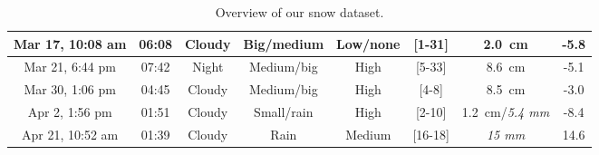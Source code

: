 \begin{table}[htbp]
\begin{tabular}{|c|c|c|c|c|c|c|c|}
        Mar 17, 10:08 am   &  06:08            & Cloudy        & Big/medium          & Low/none         & [1-31]                         & \SI{2.0}{\cm}                 & -5.8  \\\hline
        Mar 21, 6:44 pm    &  07:42            & Night         & Medium/big          & High             & [5-33]                         & \SI{8.6}{\cm}                 & -5.1  \\\hline
        Mar 30, 1:06 pm    &  04:45            & Cloudy        & Medium/big          & High             & [4-8]                          & \SI{8.5}{\cm}                 & -3.0  \\\hline
        Apr 2, 1:56 pm     &  01:51            & Cloudy        & Small/rain          & High             & [2-10]                         & \SI{1.2}{\cm}/\textit{5.4 mm} & -8.4  \\\hline
        Apr 21, 10:52 am   &  01:39            & Cloudy        & Rain                & Medium           & [16-18]                        & \textit{15 mm}                & 14.6  \\\hline
    \end{tabular}
    \caption{Overview of our snow dataset.}
    \label{tab:overview-dataset}
\end{table}

